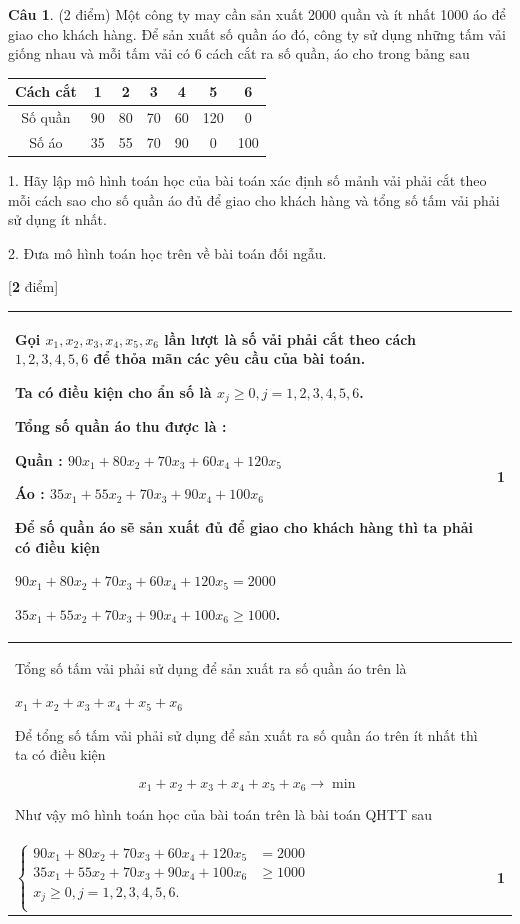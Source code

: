 \documentclass[12pt,a4letter]{article}
\theoremstyle{definition}
\newtheorem{cauhoi}{Câu}
\newenvironment{phandiem}{%
\par\noindent
\begin{longtable}[t]{|p{15cm}|p{1.2cm}|}
\hline
}{%
\end{longtable}
}
\newcommand\diem[1]{ & \hfil \textbf{#1} \\ \hline}
\newcommand\tongdiem[1]{\hfill [\textbf{#1} điểm]}
\begin{document}
\begin{cauhoi}%
(2 điểm) Một công ty may cần sản xuất 2000 quần và ít nhất 1000 áo để giao cho khách hàng. Để sản xuất số quần áo đó, công ty sử dụng những tấm vải giống nhau và mỗi tấm vải có 6 cách cắt ra số quần, áo cho trong bảng sau
\begin{center}
\begin{tabular}{| c | c  c  c  c  c  c|}
\hline
Cách cắt&1&2&3&4&5&6\\
\hline
Số quần&90&80&70&60&120&0\\
\hline
Số áo&35&55&70&90&0&100\\
\hline
\end{tabular}
\end{center}

1. Hãy lập mô hình toán học của bài toán 
xác định số mảnh vải phải cắt theo mỗi cách sao cho số quần áo đủ để giao cho khách hàng và tổng số tấm vải phải sử dụng ít nhất.

2. Đưa mô hình toán học trên về bài toán đối ngẫu.

\begin{traloi}\tongdiem{2}
\begin{phandiem}
Gọi $x_1, x_2, x_3, x_4, x_5, x_6$ lần lượt là số vải phải cắt theo cách   $1, 2, 3, 4, 5, 6$ để thỏa mãn các yêu cầu của bài toán.

Ta có điều kiện cho ẩn số là  $x_j\ge 0, j=1, 2, 3, 4, 5, 6$. 

Tổng số quần áo thu được là :
 
Quần :  $90x_1+80x_2+70x_3+60x_4+120x_5$

Áo : $35x_1+55x_2+70x_3+90x_4+100x_6$

Để số quần áo sẽ sản xuất đủ để giao cho khách hàng thì ta phải có điều kiện

  $90x_1+80x_2+70x_3+60x_4+120x_5=2000$

 $35x_1+55x_2+70x_3+90x_4+100x_6\ge 1000$.

\diem{1}

Tổng số tấm vải phải sử dụng để sản xuất ra số quần áo trên là

 $x_1+x_2+x_3+x_4+x_5+x_6$ 

Để tổng số tấm vải phải sử dụng để sản xuất ra số quần áo trên ít nhất thì ta có điều kiện

 $$x_1+x_2+x_3+x_4+x_5+x_6\rightarrow\min$$

Như vậy mô hình toán học của bài toán trên là bài toán QHTT sau
\begin{center}
$ F(x)=x_1+x_2+x_3+x_4+x_5+x_6\rightarrow\min$ \\
 $ \begin{cases}
  90x_1+80x_2+70x_3+60x_4+120x_5&=2000\\
 35x_1+55x_2+70x_3+90x_4+100x_6&\ge 1000\\
x_j\ge 0, j=1, 2, 3, 4, 5, 6.&\\ 
\end{cases} $
\end{center}
\diem{1}

\end{phandiem}
\end{traloi}
\end{cauhoi}
\end{document}
